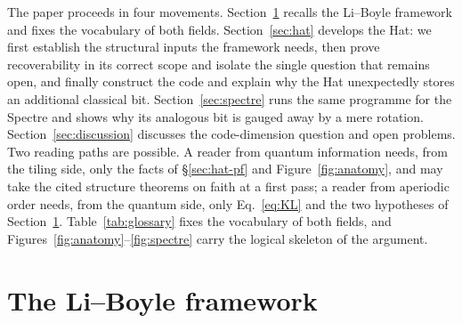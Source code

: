 \documentclass[a4paper,unpublished]{quantumarticle}
\theoremstyle{remark}
\begin{document}
The paper proceeds in four movements. Section~\ref{sec:framework}
recalls the Li--Boyle framework and fixes the vocabulary of both
fields. Section~\ref{sec:hat} develops the Hat: we first establish
the structural inputs the framework needs, then prove recoverability
in its correct scope and isolate the single question that remains
open, and finally construct the code and explain why the Hat
unexpectedly stores an additional classical bit.
Section~\ref{sec:spectre} runs the same programme for the Spectre
and shows why its analogous bit is gauged away by a mere rotation.
Section~\ref{sec:discussion} discusses the code-dimension question
and open problems. Two reading paths are possible. A reader from
quantum information needs, from the tiling side, only the facts of
\S\ref{sec:hat-pf} and Figure~\ref{fig:anatomy}, and may take the
cited structure theorems on faith at a first pass; a reader from
aperiodic order needs, from the quantum side, only
Eq.~\eqref{eq:KL} and the two hypotheses of
Section~\ref{sec:framework}. Table~\ref{tab:glossary} fixes the
vocabulary of both fields, and
Figures~\ref{fig:anatomy}--\ref{fig:spectre} carry the logical
skeleton of the argument.

\section{The Li--Boyle framework}
\label{sec:framework}
\end{document}
